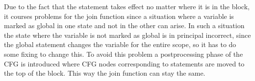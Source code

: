 Due to the fact that the  statement takes effect no matter where it is in the block, it courses problems for the join function since a situation where a variable  is marked as global in one state and not in the other can arise. In such a situation the state where the variable is not marked as global is in principal incorrect, since the global statement changes the variable for the entire scope, so it has to do some fixing to change this. To avoid this problem a postprocessing phase of the CFG is introduced where CFG nodes corresponding to  statements are moved to the top of the block. This way the join function can stay the same.




